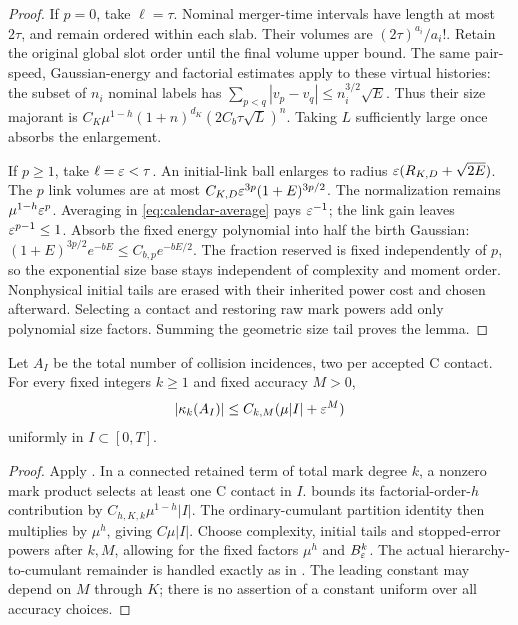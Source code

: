 \begin{proof}
If $p=0$, take $\ell=\tau$. Nominal merger-time intervals have length at
most $2\tau$, and remain ordered within each slab.
Their volumes are $(2\tau)^{a_i}/a_i!$.
Retain the original global slot order until the final volume upper bound.
The same pair-speed, Gaussian-energy and factorial estimates apply to
these virtual histories: the subset of $n_i$ nominal labels has
$\sum_{p<q}|v_p-v_q|\leq n_i^{3/2}\sqrt E$.
Thus their size majorant is
$C_K\mu^{1-h}(1+n)^{d_K}(2C_b\tau\sqrt L)^n$.
Taking $L$ sufficiently large once absorbs the enlargement.

If $p\geq1$, take $\ell=\varepsilon<\tau$. An initial-link ball enlarges to
radius $\varepsilon(R_{K,D}+\sqrt{2E})$. The $p$ link volumes are at most
$C_{K,D}\varepsilon^{3p}(1+E)^{3p/2}$.
The normalization remains $\mu^{1-h}\varepsilon^p$.
Averaging in \eqref{eq:calendar-average} pays $\varepsilon^{-1}$; the link gain
leaves $\varepsilon^{p-1}\leq1$.
Absorb the fixed energy polynomial into half the birth Gaussian:
$(1+E)^{3p/2}e^{-bE}\leq C_{b,p}e^{-bE/2}$.
The fraction reserved is fixed independently of $p$, so the exponential
size base stays independent of complexity and moment order.
Nonphysical initial tails are erased with their inherited power cost
and chosen afterward.
Selecting a contact and restoring raw mark powers add only polynomial
size factors. Summing the geometric size tail proves the lemma.
\end{proof}

\begin{proposition}\label{prop:counts}
Let $A_I$ be the total number of collision incidences, two per accepted
C contact. For every fixed integers $k\geq1$ and fixed accuracy $M>0$,
\[
 |\kappa_k(A_I)|\leq C_{k,M}(\mu|I|+\varepsilon^M)
\]
uniformly in $I\subset[0,T]$.
\end{proposition}
\begin{proof}
Apply . In a connected retained term of total mark degree
$k$, a nonzero mark product selects at least one C contact in $I$.
 bounds its factorial-order-$h$ contribution by
$C_{h,K,k}\mu^{1-h}|I|$. The ordinary-cumulant partition identity then
multiplies by $\mu^h$, giving $C\mu|I|$.
Choose complexity, initial tails and stopped-error powers after $k,M$,
allowing for the fixed factors $\mu^h$ and $B_\varepsilon^k$.
The actual hierarchy-to-cumulant remainder is handled exactly as in
. The leading constant may depend on $M$ through $K$;
there is no assertion of a constant uniform over all accuracy choices.
\end{proof}

